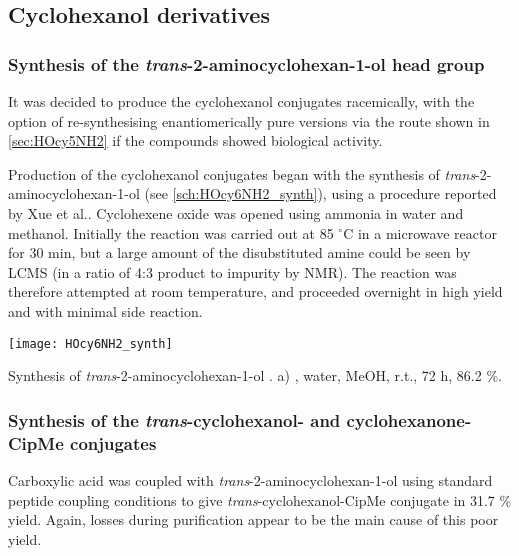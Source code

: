 \subsection{Cyclohexanol derivatives}

\subsubsection{Synthesis of the \textit{trans}-2-aminocyclohexan-1-ol head group}

It was decided to produce the cyclohexanol conjugates racemically, with the option of re-synthesising enantiomerically pure versions via the route shown in \ref{sec:HOcy5NH2} if the compounds showed biological activity.

Production of the cyclohexanol conjugates began with the synthesis of \textit{trans}-2-aminocyclohexan-1-ol  (see \ref{sch:HOcy6NH2_synth}), using a procedure reported by Xue et al.\cite{Xue2006}.
Cyclohexene oxide  was opened using ammonia in water and methanol. Initially the reaction was carried out at 85 $^{\circ}$C in a microwave reactor for 30 min, but a large amount of the disubstituted amine could be seen by LCMS (in a ratio of 4:3 product to impurity by NMR). The reaction was therefore attempted at room temperature, and proceeded overnight in high yield and with minimal side reaction.

\begin{scheme}[H]
	\begin{center}
		\texttt{[image: HOcy6NH2\_synth]}
		\caption{Synthesis of \textit{trans}-2-aminocyclohexan-1-ol .
		a) , water, MeOH, r.t., 72 h, 86.2 \%.
		\label{sch:HOcy6NH2_synth}}
	\end{center}
\end{scheme}

\subsubsection{Synthesis of the \textit{trans}-cyclohexanol- and cyclohexanone-CipMe conjugates\label{sec:Ocy6}}

Carboxylic acid  was coupled with \textit{trans}-2-aminocyclohexan-1-ol  using standard peptide coupling conditions to give \textit{trans}-cyclohexanol-CipMe conjugate  in 31.7 \% yield. Again, losses during purification appear to be the main cause of this poor yield.

